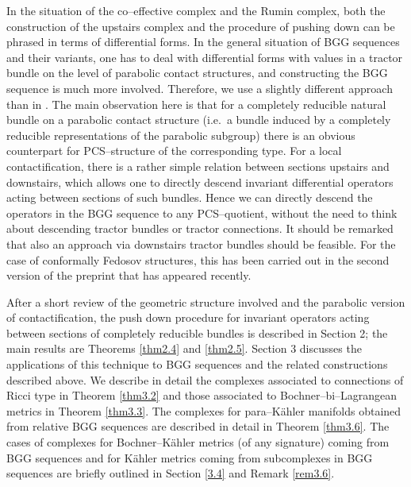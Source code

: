 \documentclass[12pt,a4paper]{amsart}
\numberwithin{theorem}{section}
\theoremstyle{definition}
\theoremstyle{remark}
\begin{document}
In the situation of the co--effective complex and the Rumin complex,
both the construction of the upstairs complex and the procedure of
pushing down can be phrased in terms of differential forms. In the
general situation of BGG sequences and their variants, one has to deal
with differential forms with values in a tractor bundle on the level
of parabolic contact structures, and constructing the BGG sequence is
much more involved. Therefore, we use a slightly different approach
than in \cite{Cap-Salac}. The main observation here is that for a
completely reducible natural bundle on a parabolic contact structure
(i.e.~a bundle induced by a completely reducible representations of
the parabolic subgroup) there is an obvious counterpart for
PCS--structure of the corresponding type. For a local
contactification, there is a rather simple relation between sections
upstairs and downstairs, which allows one to directly descend
invariant differential operators acting between sections of such
bundles. Hence we can directly descend the operators in the BGG
sequence to any PCS--quotient, without the need to think about
descending tractor bundles or tractor connections. It should be
remarked that also an approach via downstairs tractor bundles should
be feasible. For the case of conformally Fedosov structures, this has
been carried out in the second version of the preprint \cite{E-S} that
has appeared recently.

After a short review of the geometric structure involved and the
parabolic version of contactification, the push down procedure for
invariant operators acting between sections of completely reducible
bundles is described in Section 2; the main results are Theorems
\ref{thm2.4} and \ref{thm2.5}. Section 3 discusses the applications of this
technique to BGG sequences and the related constructions described
above. We describe in detail the complexes associated to connections
of Ricci type in Theorem \ref{thm3.2} and those associated to
Bochner--bi--Lagrangean metrics in Theorem \ref{thm3.3}. The complexes
for para--K\"ahler manifolds obtained from relative BGG sequences are
described in detail in Theorem \ref{thm3.6}. The cases of complexes for
Bochner--K\"ahler metrics (of any signature) coming from BGG sequences
and for K\"ahler metrics coming from subcomplexes in BGG sequences are
briefly outlined in Section \ref{3.4} and Remark \ref{rem3.6}.
\end{document}
